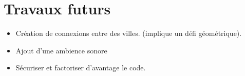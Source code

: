 \documentclass[11pt,a4paper]{article}
\begin{document}
\part{Travaux futurs}
\begin{itemize}
\item Création de connexions entre des villes. (implique un défi géométrique).
\item Ajout d'une ambience sonore 
\item Sécuriser et factoriser d'avantage le code.
\end{itemize}
\end{document}
